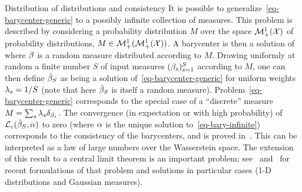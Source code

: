 \begin{rem2}{Distribution of distributions and consistency}
	It is possible to generalize~\eqref{eq-barycenter-generic} to a possibly infinite collection of measures. This problem is described by considering a probability distribution $M$ over the space $\mathcal{M}_+^1(\mathcal{X})$ of probability distributions, \ie $M \in \mathcal{M}_+^1(\mathcal{M}_+^1(\mathcal{X}))$. A barycenter is then a solution of 
	where $\beta$ is a random measure distributed according to $M$. Drawing uniformly at random a finite number $S$ of input measures $(\beta_s)_{s=1}^S$ according to $M$, one can then define $\hat {\beta}_S$ as being a solution of~\eqref{eq-barycenter-generic} for uniform weights $\lambda_s=1/S$ (note that here $\hat {\beta}_S$ is itself a random measure). 
	Problem~\eqref{eq-barycenter-generic} corresponds to the special case of a ``discrete'' measure $M=\sum_s \lambda_s \delta_{\beta_s}$.
	The convergence (in expectation or with high probability) of $\mathcal{L}_{c}(\hat{\beta}_S,\alpha)$ to zero (where $\alpha$ is the unique solution to~\eqref{eq-bary-infinite}) corresponds to the consistency of the barycenters, and is proved in~\citep{BigotBarycenter,leGouic2016existence,bigot2012characterization}.
	This can be interpreted as a law of large numbers over the Wasserstein space. The extension of this result to a central limit theorem is an important problem; see~\citep{panaretos2016amplitude} and~\citep{agueh2017vers} for recent formulations of that problem and solutions in particular cases (1-D distributions and Gaussian measures).
\end{rem2}


